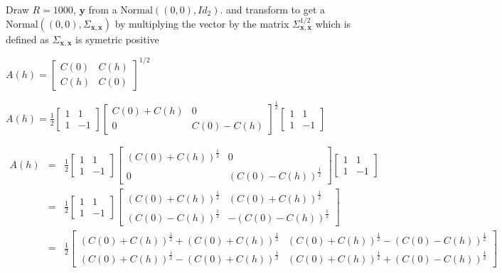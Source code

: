 \documentclass[12pt]{article}
\theoremstyle{definition}
\theoremstyle{remark}
\newcommand{\Covariogram}{C}
\newcommand{\position}{\mathbf{x}}
\newcommand{\signal}{\mathbf{y}}
\begin{document}
Draw $R=1000$, $\signal$ from a $\mathrm{Normal}((0,0),Id_2)$.
and transform to get a 
$\mathrm{Normal}((0,0),\Sigma_{\position,\position})$
by multiplying the vector by the matrix $\Sigma_{\position,\position}^{1/2}$ which is defined as 
$\Sigma_{\position,\position}$ is symetric positive



$A(h)=\begin{bmatrix}\Covariogram(0)&\Covariogram(h)\\\Covariogram(h)&\Covariogram(0)\end{bmatrix}^{1/2}$

$A(h)=\frac12\begin{bmatrix}1&1\\1&-1\end{bmatrix}\begin{bmatrix}C(0)+C(h)&0\\0&C(0)-C(h)\end{bmatrix}^{\frac12}\begin{bmatrix}1&1\\1&-1\end{bmatrix}$

\begin{eqnarray*}
A(h)&=&\frac12\begin{bmatrix}1&1\\1&-1\end{bmatrix}\begin{bmatrix}(C(0)+C(h))^{\frac12}&0\\0&(C(0)-C(h))^{\frac12}\end{bmatrix}\begin{bmatrix}1&1\\1&-1\end{bmatrix}\\
&=&\frac12\begin{bmatrix}1&1\\1&-1\end{bmatrix}\begin{bmatrix}(C(0)+C(h))^{\frac12}&(C(0)+C(h))^{\frac12}\\(C(0)-C(h))^{\frac12}&-(C(0)-C(h))^{\frac12}\end{bmatrix}\\
&=&\frac12\begin{bmatrix}(C(0)+C(h))^{\frac12}+
                         (C(0)+C(h))^{\frac12}
                        &(C(0)+C(h))^{\frac12}-
                         (C(0)-C(h))^{\frac12}\\
                         (C(0)+C(h))^{\frac12}-
                         (C(0)+C(h))^{\frac12}
                        &(C(0)+C(h))^{\frac12}+
                         (C(0)-C(h))^{\frac12}\end{bmatrix}
\end{eqnarray*}
\end{document}
